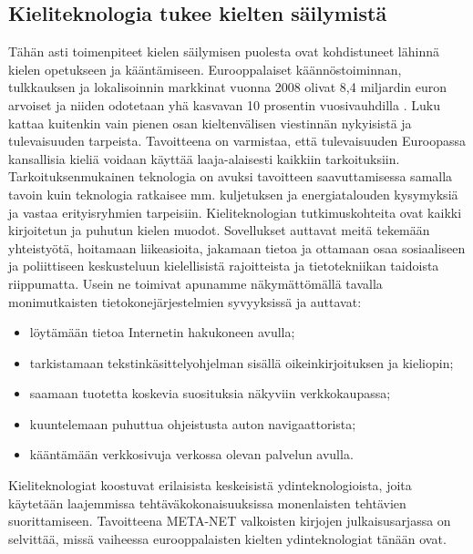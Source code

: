 \begin{multicols}{2}
\subsection{Kieliteknologia tukee kielten säilymistä}


Tähän asti toimenpiteet kielen säilymisen puolesta ovat kohdistuneet lähinnä kielen
opetukseen ja kääntämiseen. Eurooppalaiset käännöstoiminnan, tulkkauksen 
ja lokalisoinnin markkinat vuonna 2008
olivat 8,4 miljardin euron arvoiset ja niiden odotetaan yhä kasvavan
10 prosentin vuosivauhdilla \cite{EC-size}. Luku kattaa kuitenkin vain
pienen osan kieltenvälisen viestinnän nykyisistä ja tulevaisuuden
tarpeista. Tavoitteena on varmistaa, että tulevaisuuden Euroopassa
kansallisia kieliä voidaan käyttää laaja-alaisesti kaikkiin
tarkoituksiin. Tarkoituksenmukainen teknologia on avuksi tavoitteen 
saavuttamisessa samalla tavoin kuin teknologia ratkaisee mm. kuljetuksen ja 
energiatalouden kysymyksiä ja vastaa erityisryhmien tarpeisiin.
Kieliteknologian tutkimuskohteita ovat kaikki kirjoitetun ja puhutun kielen
muodot. Sovellukset auttavat meitä tekemään yhteistyötä, hoitamaan
liikeasioita, jakamaan tietoa ja ottamaan osaa sosiaaliseen ja poliittiseen
keskusteluun kielellisistä rajoitteista ja tietotekniikan taidoista
riippumatta. Usein ne toimivat apunamme näkymättömällä tavalla monimutkaisten
tietokonejärjestelmien syvyyksissä ja auttavat:
\begin{itemize}
\item löytämään tietoa Internetin hakukoneen avulla;

\item tarkistamaan tekstinkäsittelyohjelman sisällä oikeinkirjoituksen ja kieliopin;

\item saamaan tuotetta koskevia suosituksia näkyviin verkkokaupassa;

\item kuuntelemaan puhuttua ohjeistusta auton navigaattorista;

\item kääntämään verkkosivuja verkossa olevan palvelun avulla.
\end{itemize}

Kieliteknologiat koostuvat erilaisista keskeisistä ydinteknologioista, joita
käytetään laajemmissa tehtäväkokonaisuuksissa monenlaisten tehtävien
suorittamiseen. Tavoitteena META-NET valkoisten kirjojen julkaisusarjassa on 
selvittää, missä vaiheessa eurooppalaisten kielten ydinteknologiat tänään ovat.


\end{multicols}
